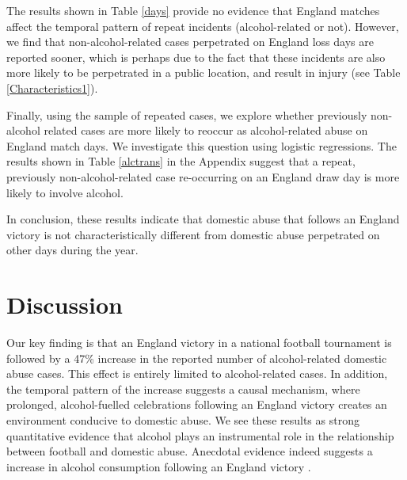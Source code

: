 \documentclass[12pt, a4paper]{article}
\begin{document}
The results shown in Table \ref{days} provide no evidence that England matches affect the temporal pattern of repeat incidents (alcohol-related or not). However, we find that non-alcohol-related cases perpetrated on England loss days are reported sooner, which is perhaps due to the fact that these incidents are also more likely to be perpetrated in a public location, and result in injury (see Table \ref{Characteristics1}).



Finally, using the sample of repeated cases, we explore whether previously non-alcohol related cases are more likely to reoccur as alcohol-related abuse on England match days. We investigate this question using logistic regressions. The results shown in Table \ref{alctrans} in the Appendix suggest that a repeat, previously non-alcohol-related case re-occurring on an England draw day is more likely to involve alcohol.  

In conclusion, these results indicate that domestic abuse that follows an England victory is not characteristically different from domestic abuse perpetrated on other days during the year.

\clearpage

\section*{Discussion}

Our key finding is that an England victory in a national football tournament is followed by a 47\% increase in the reported number of alcohol-related domestic abuse cases. This effect is entirely limited to alcohol-related cases. In addition, the temporal pattern of the increase suggests a causal mechanism, where prolonged, alcohol-fuelled celebrations following an England victory creates an environment conducive to domestic abuse. We see these results as strong quantitative evidence that alcohol plays an instrumental role in the relationship between football and domestic abuse. Anecdotal evidence indeed suggests a increase in alcohol consumption following an England victory  \cite{Davies2018}.
\end{document}
